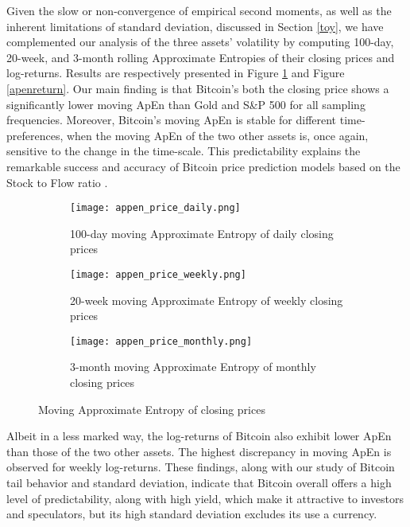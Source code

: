 \documentclass[12pt]{article}
\begin{document}
Given the slow or non-convergence of empirical second moments, as well as the inherent limitations of standard deviation, discussed in Section \ref{toy}, we have complemented our analysis of the three assets'  volatility by computing 100-day, 20-week, and 3-month rolling Approximate Entropies of their closing prices and log-returns. Results are respectively presented in Figure \ref{apen} and Figure \ref{apenreturn}.
Our main finding is that Bitcoin's both the closing price shows a significantly lower moving ApEn than Gold and S\&P 500 for all sampling frequencies. Moreover, Bitcoin's moving ApEn is stable for different time-preferences, when the moving ApEn of the two other assets is, once again, sensitive to the change in the time-scale. This predictability explains the remarkable success and accuracy of Bitcoin price prediction models based on the Stock to Flow ratio \cite{saifedean}. 
\begin{figure}[H]
\centering
\begin{subfigure}[b]{\textwidth}
\texttt{[image: appen\_price\_daily.png]}\hfill
\caption{100-day moving Approximate Entropy of daily closing prices}
\end{subfigure}

\begin{subfigure}[b]{\textwidth}
\texttt{[image: appen\_price\_weekly.png]}
\caption{20-week moving Approximate Entropy of weekly closing prices}
\end{subfigure}

\hfill
\begin{subfigure}[b]{\textwidth}
\texttt{[image: appen\_price\_monthly.png]}
\caption{3-month moving Approximate Entropy of monthly closing prices}
\end{subfigure}





\caption{Moving Approximate Entropy of closing prices}

\label{apen}
\end{figure}
Albeit in a less marked way, the log-returns of Bitcoin also exhibit lower ApEn than those of the two other assets. The highest discrepancy in moving ApEn is observed for weekly log-returns. These findings, along with our study of Bitcoin tail behavior and standard deviation, indicate that Bitcoin overall offers a high level of predictability, along with high yield, which make it attractive to investors and speculators, but its high standard deviation excludes its use a currency. 
\end{document}

